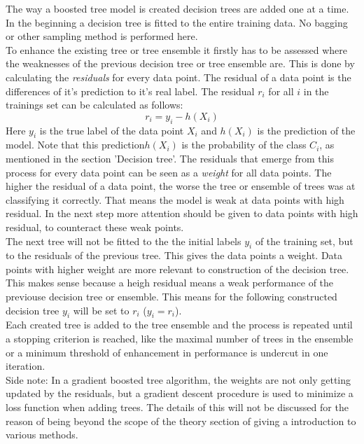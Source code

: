 The way a boosted tree model is created decision trees are added one at a time.
\\
In the beginning a decision tree is fitted to the entire training data. No bagging or other sampling method is performed here. 
\\
To enhance the existing tree or tree ensemble it firstly has to be assessed where the weaknesses of the previous decision tree or tree ensemble are. This is done by calculating the \emph{residuals} for every data point. The residual of a data point is the differences of it's prediction to it's real label. The residual $r_i$ for all $i$ in the trainings set can be calculated as follows:
 \begin{equation} \label{eq:20}
r_i=y_i-h(X_i)
\end{equation}
Here $y_i$ is the true label of the data point $X_i$ and $h(X_i)$ is the prediction of the model. Note that this prediction$h(X_i)$ is the probability of the class $C_i$, as mentioned in the section 'Decision tree'. The residuals that emerge from this process for every data point can be seen as a \emph{weight} for all data points. The higher the residual of a data point, the worse the tree or ensemble of trees was at classifying it correctly. That means the model is weak at data points with high residual. In the next step more attention should be given to data points with high residual, to counteract these weak points.
\\
The next tree will not be fitted to the the initial labels $y_i$ of the training set, but to the residuals of the previous tree. This gives the data points a weight. Data points with higher weight are more relevant to construction of the decision tree. This makes sense because a heigh residual means a weak performance of the previouse decision tree or ensemble. This means for the following constructed decision tree $y_i$ will be set to $r_i$ ($y_i=r_i$).
\\
Each created tree is added to the tree ensemble and the process is repeated until a stopping criterion is reached, like the maximal number of trees in the ensemble or a minimum threshold of enhancement in performance is undercut in one iteration.
\\
Side note: In a gradient boosted tree algorithm, the weights are not only getting updated by the residuals, but a gradient descent procedure is used to minimize a loss function when adding trees. The details of this will not be discussed for the reason of being beyond the scope of the theory section of giving a introduction to various methods.
\\

